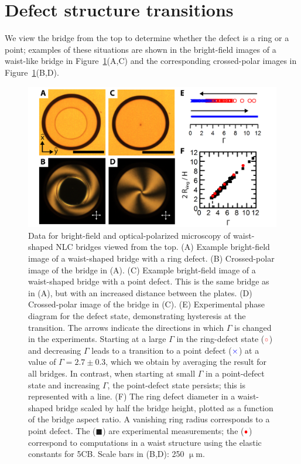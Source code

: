 \section{Defect structure transitions}
We view the bridge from the top to determine whether the defect is a ring or a point; examples of these situations are shown in the bright-field images of a waist-like bridge in Figure~\ref{f:5-ExpWaistTop}(A,C) and the corresponding crossed-polar images in  Figure~\ref{f:5-ExpWaistTop}(B,D).
\begin{figure}
  \centering
  \includegraphics{figures/C5/Ch5-Figs_ExpWaistTop.png}
  \caption{Data for bright-field and optical-polarized microscopy of waist-shaped NLC bridges viewed from the top.
  (A) Example bright-field image of a waist-shaped bridge with a ring defect.
  (B) Crossed-polar image of the bridge in (A).
  (C) Example bright-field image of a waist-shaped bridge with a point defect. This is the same bridge as in (A), but with an increased distance between the plates.
  (D) Crossed-polar image of the bridge in (C).
  (E) Experimental phase diagram for the defect state, demonstrating hysteresis at the transition.
  The arrows indicate the directions in which $\Gamma$ is changed in the experiments.
  Starting at a large $\Gamma$ in the ring-defect state (${\color{red} \circ}$) and decreasing $\Gamma$ leads to a transition to a point defect (${\color{blue} \times}$) at a value of $\Gamma = 2.7 \pm 0.3$, which we obtain by averaging the result for all bridges.
  In contrast, when starting at small $\Gamma$ in a point-defect state and increasing $\Gamma$, the point-defect state persists; this is represented with a line.
  (F) The ring defect diameter in a waist-shaped bridge scaled by half the bridge height, plotted as a function of the bridge aspect ratio. A vanishing ring radius corresponds to a point defect.
  The ($\blacksquare$) are experimental measurements; the (${\color{red} \bullet}$) correspond to computations in a waist structure using the elastic constants for 5CB.\@
  Scale bars in (B,D): 250 $\upmu$m.}\label{f:5-ExpWaistTop}
\end{figure}

